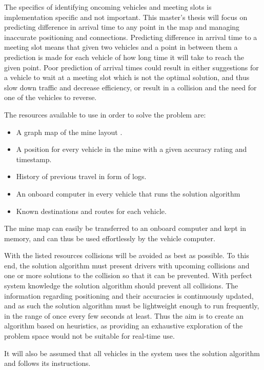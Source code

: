 \documentclass{article}
\begin{document}
			The specifics of identifying oncoming vehicles and meeting slots is implementation specific and not important. This master's thesis will focus on predicting difference in arrival time to any point in the map and managing inaccurate positioning and connections. Predicting difference in arrival time to a meeting slot means that given two vehicles and a point in between them a prediction is made for each vehicle of how long time it will take to reach the given point. Poor prediction of arrival times could result in either suggestions for a vehicle to wait at a meeting slot which is not the optimal solution, and thus slow down traffic and decrease efficiency, or result in a collision and the need for one of the vehicles to reverse.

			The resources available to use in order to solve the problem are:
	        \begin{itemize}
                \item A graph map of the mine layout .
                \item A position for every vehicle in the mine with a given accuracy rating and timestamp.
				\item History of previous travel in form of logs.
	            \item An onboard computer in every vehicle that runs the solution algorithm
	            \item Known destinations and routes for each vehicle.
	        \end{itemize}

			The mine map can easily be transferred to an onboard computer and kept in memory, and can thus be used effortlessly by the vehicle computer.

			With the listed resources collisions will be avoided as best as possible. To this end, the solution algorithm must present drivers with upcoming collisions and one or more solutions to the collision so that it can be prevented. With perfect system knowledge the solution algorithm should prevent all collisions. The information regarding positioning and their accuracies is continuously updated, and as such the solution algorithm must be lightweight enough to run frequently, in the range of once every few seconds at least. Thus the aim is to create an algorithm based on heuristics, as providing an exhaustive exploration of the problem space would not be suitable for real-time use.

			It will also be assumed that all vehicles in the system uses the solution algorithm and follows its instructions.
\end{document}
